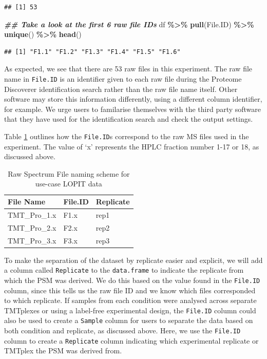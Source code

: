 \documentclass[9pt,a4paper,]{extarticle}
\newenvironment{Shaded}{\begin{snugshade}}{\end{snugshade}}
\newcommand{\DocumentationTok}[1]{\textcolor[rgb]{0.56,0.35,0.01}{\textbf{\textit{#1}}}}
\newcommand{\FunctionTok}[1]{\textcolor[rgb]{0.13,0.29,0.53}{\textbf{#1}}}
\newcommand{\NormalTok}[1]{#1}
\newcommand{\SpecialCharTok}[1]{\textcolor[rgb]{0.81,0.36,0.00}{\textbf{#1}}}
\begin{document}
\begin{verbatim}
## [1] 53
\end{verbatim}

\begin{Shaded}
\begin{Highlighting}[]
\DocumentationTok{\#\# Take a look at the first 6 raw file IDs}
\NormalTok{df }\SpecialCharTok{\%\textgreater{}\%}
  \FunctionTok{pull}\NormalTok{(File.ID) }\SpecialCharTok{\%\textgreater{}\%}
  \FunctionTok{unique}\NormalTok{() }\SpecialCharTok{\%\textgreater{}\%}
  \FunctionTok{head}\NormalTok{()}
\end{Highlighting}
\end{Shaded}

\begin{verbatim}
## [1] "F1.1" "F1.2" "F1.3" "F1.4" "F1.5" "F1.6"
\end{verbatim}

As expected, we see that there are 53 raw files in this experiment. The raw file
name in \texttt{File.ID} is an identifier given to each raw file during the Proteome
Discoverer identification search rather than the raw file name itself. Other
software may store this information differently, using a different column identifier,
for example. We urge users to familarise themselves with the third party software
that they have used for the identification search and check the output settings.

Table \ref{tab:samplestable} outlines how the \texttt{File.ID}s correspond to the raw MS
files used in the experiment. The value of `x' represents the HPLC fraction number
1-17 or 18, as discussed above.

\begin{table}[H]
\centering
\caption{\label{tab:samplestable}Raw Spectrum File naming scheme for use-case LOPIT data}
\centering
\begin{tabular}[t]{l|l|l}
\hline
File Name & File.ID & Replicate\\
\hline
TMT\_Pro\_1.x & F1.x & rep1\\
\hline
TMT\_Pro\_2.x & F2.x & rep2\\
\hline
TMT\_Pro\_3.x & F3.x & rep3\\
\hline
\end{tabular}
\end{table}

To make the separation of the dataset by replicate easier and explicit, we will
add a column called \texttt{Replicate} to the \texttt{data.frame} to indicate the replicate
from which the PSM was derived. We do this based on the value found in the
\texttt{File.ID} column, since this tells us the raw file ID and we know which files
corresponded to which replicate. If samples from each condition were analysed
across separate TMTplexes or using a label-free experimental design, the \texttt{File.ID}
column could also be used to create a \texttt{Sample} column for users to separate the
data based on both condition and replicate, as discussed above. Here, we use
the \texttt{File.ID} column to create a \texttt{Replicate} column indicating which experimental
replicate or TMTplex the PSM was derived from.
\end{document}
